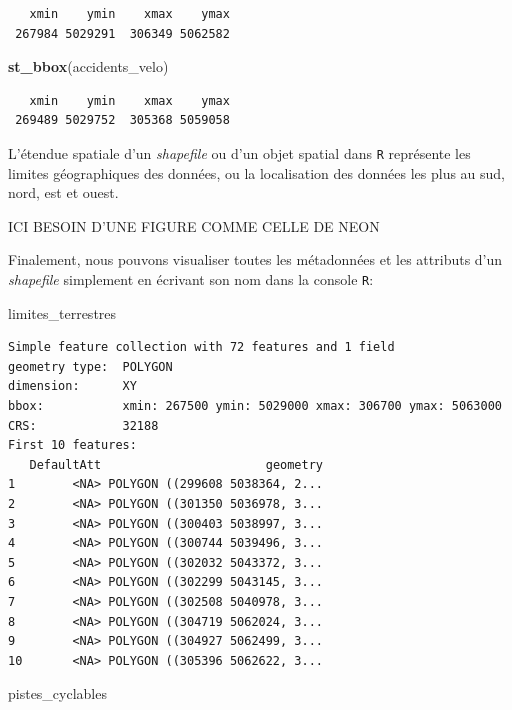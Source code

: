 \documentclass[
  12pt,
]{krantz}
\newenvironment{Shaded}{\begin{snugshade}}{\end{snugshade}}
\newcommand{\KeywordTok}[1]{\textcolor[rgb]{0.13,0.29,0.53}{\textbf{#1}}}
\newcommand{\NormalTok}[1]{#1}
\begin{document}
\begin{verbatim}
   xmin    ymin    xmax    ymax 
 267984 5029291  306349 5062582 
\end{verbatim}

\begin{Shaded}
\begin{Highlighting}[]
\KeywordTok{st_bbox}\NormalTok{(accidents_velo)}
\end{Highlighting}
\end{Shaded}

\begin{verbatim}
   xmin    ymin    xmax    ymax 
 269489 5029752  305368 5059058 
\end{verbatim}

L'étendue spatiale d'un \emph{shapefile} ou d'un objet spatial dans \texttt{R} représente les limites géographiques des données, ou la localisation des données les plus au sud, nord, est et ouest.

ICI BESOIN D'UNE FIGURE COMME CELLE DE NEON

Finalement, nous pouvons visualiser toutes les métadonnées et les attributs d'un \emph{shapefile} simplement en écrivant son nom dans la console \texttt{R}:

\begin{Shaded}
\begin{Highlighting}[]
\NormalTok{limites_terrestres}
\end{Highlighting}
\end{Shaded}

\begin{verbatim}
Simple feature collection with 72 features and 1 field
geometry type:  POLYGON
dimension:      XY
bbox:           xmin: 267500 ymin: 5029000 xmax: 306700 ymax: 5063000
CRS:            32188
First 10 features:
   DefaultAtt                       geometry
1        <NA> POLYGON ((299608 5038364, 2...
2        <NA> POLYGON ((301350 5036978, 3...
3        <NA> POLYGON ((300403 5038997, 3...
4        <NA> POLYGON ((300744 5039496, 3...
5        <NA> POLYGON ((302032 5043372, 3...
6        <NA> POLYGON ((302299 5043145, 3...
7        <NA> POLYGON ((302508 5040978, 3...
8        <NA> POLYGON ((304719 5062024, 3...
9        <NA> POLYGON ((304927 5062499, 3...
10       <NA> POLYGON ((305396 5062622, 3...
\end{verbatim}

\begin{Shaded}
\begin{Highlighting}[]
\NormalTok{pistes_cyclables}
\end{Highlighting}
\end{Shaded}
\end{document}
